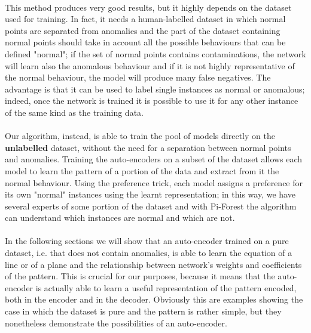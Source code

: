 \paragraph{}
This method produces very good results, but it highly depends on the dataset used for training. In fact, it needs a human-labelled dataset in which normal points are separated from anomalies and the part of the dataset containing normal points should take in account all the possible behaviours that can be defined "normal"; if the set of normal points contains contaminations, the network will learn also the anomalous behaviour and if it is not highly representative of the normal behaviour, the model will produce many false negatives. \newline
The advantage is that it can be used to label single instances as normal or anomalous; indeed, once the network is trained it is possible to use it for any other instance of the same kind as the training data.

\paragraph{}
Our algorithm, instead, is able to train the pool of models directly on the \textbf{unlabelled} dataset, without the need for a separation between normal points and anomalies. Training the auto-encoders on a subset of the dataset allows each model to learn the pattern of a portion of the data and extract from it the normal behaviour. Using the preference trick, each model assigns a preference for its own "normal" instances using the learnt representation; in this way, we have several experts of some portion of the dataset and with Pi-Forest the algorithm can understand which instances are normal and which are not.

\paragraph{}
In the following sections we will show that an auto-encoder trained on a pure dataset, i.e. that does not contain anomalies, is able to learn the equation of a line or of a plane and the relationship between network's weights and coefficients of the pattern. \newline
This is crucial for our purposes, because it means that the auto-encoder is actually able to learn a useful representation of the pattern encoded, both in the encoder and in the decoder. Obviously this are examples showing the case in which the dataset is pure and the pattern is rather simple, but they nonetheless demonstrate the possibilities of an auto-encoder.


